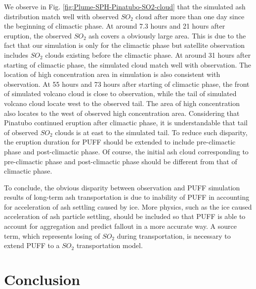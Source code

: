 We observe in Fig. \ref{fig:Plume-SPH-Pinatubo-SO2-cloud} that the simulated ash distribution match well with observed $SO_2$ cloud after more than one day since the beginning of climactic phase. At around 7.3 hours and 21 hours after eruption, the observed $SO_2$ ash covers a obviously large area. This is due to the fact that our simulation is only for the climactic phase but satellite observation includes $SO_2$ clouds existing before the climactic phase. At around 31 hours after starting of climactic phase, the simulated cloud match well with observation. The location of high concentration area in simulation is also consistent with observation. At 55 hours and 73 hours after starting of climactic phase, the front of simulated volcano cloud is close to observation, while the tail of simulated volcano cloud locate west to the observed tail. The area of high concentration also locates to the west of observed high concentration area. Considering that Pinatubo continued eruption after climactic phase, it is understandable that tail of observed $SO_2$ clouds is at east to the simulated tail. To reduce such disparity, the eruption duration for PUFF should be extended to include pre-climactic phase and post-climactic phase. Of course, the initial ash cloud corresponding to pre-climactic phase and post-climactic phase should be different from that of climactic phase.

To conclude, the obvious disparity between observation and PUFF simulation results of long-term ash transportation is due to inability of PUFF in accounting for acceleration of ash settling caused by ice. More physics, such as the ice caused acceleration of ash particle settling, should be included so that PUFF is able to account for aggregation and predict fallout in a more accurate way. A source term, which represents losing of $SO_2$ during transportation, is necessary to extend PUFF to a $SO_2$ transportation model.

\section*{Conclusion}

